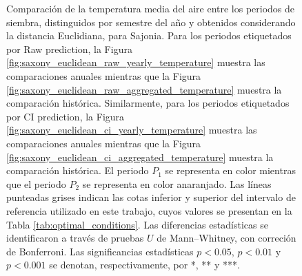 \begin{figure}[htbp]
	\caption{
		Comparación de la temperatura media del aire entre los periodos de siembra, distinguidos por semestre del año y obtenidos considerando la distancia Euclidiana, para Sajonia. Para los periodos etiquetados por Raw prediction, la Figura \ref{fig:saxony_euclidean_raw_yearly_temperature} muestra las comparaciones anuales mientras que la Figura \ref{fig:saxony_euclidean_raw_aggregated_temperature} muestra la comparación histórica. Similarmente, para los periodos etiquetados por CI prediction, la Figura \ref{fig:saxony_euclidean_ci_yearly_temperature} muestra las comparaciones anuales mientras que la Figura \ref{fig:saxony_euclidean_ci_aggregated_temperature} muestra la comparación histórica. El periodo $P_1$ se representa en color mientras que el periodo $P_2$ se representa en color anaranjado. Las líneas punteadas grises indican las cotas inferior y superior del intervalo de referencia utilizado en este trabajo, cuyos valores se presentan en la Tabla \ref{tab:optimal_conditions}. Las diferencias estadísticas se identificaron a través de pruebas $U$ de Mann--Whitney, con correción de Bonferroni. Las significancias estadísticas $p<0.05$, $p<0.01$ y $p<0.001$ se denotan, respectivamente, por *, ** y ***.
	}
	\label{fig:saxony_euclidean_average_temperature}
	
	
\end{figure}



